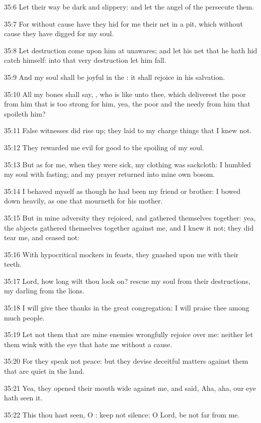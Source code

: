 35:6 Let their way be dark and slippery: and let the angel of the \LORD
persecute them.

35:7 For without cause have they hid for me their net in a pit, which
without cause they have digged for my soul.

35:8 Let destruction come upon him at unawares; and let his net that
he hath hid catch himself: into that very destruction let him fall.

35:9 And my soul shall be joyful in the \LORD: it shall rejoice in his
salvation.

35:10 All my bones shall say, \LORD, who is like unto thee, which
deliverest the poor from him that is too strong for him, yea, the poor
and the needy from him that spoileth him?

35:11 False witnesses did rise up; they laid to my charge things that
I knew not.

35:12 They rewarded me evil for good to the spoiling of my soul.

35:13 But as for me, when they were sick, my clothing was sackcloth: I
humbled my soul with fasting; and my prayer returned into mine own
bosom.

35:14 I behaved myself as though he had been my friend or brother: I
bowed down heavily, as one that mourneth for his mother.

35:15 But in mine adversity they rejoiced, and gathered themselves
together: yea, the abjects gathered themselves together against me,
and I knew it not; they did tear me, and ceased not:

35:16 With hypocritical mockers in feasts, they gnashed upon me with
their teeth.

35:17 Lord, how long wilt thou look on? rescue my soul from their
destructions, my darling from the lions.

35:18 I will give thee thanks in the great congregation: I will praise
thee among much people.

35:19 Let not them that are mine enemies wrongfully rejoice over me:
neither let them wink with the eye that hate me without a cause.

35:20 For they speak not peace: but they devise deceitful matters
against them that are quiet in the land.

35:21 Yea, they opened their mouth wide against me, and said, Aha,
aha, our eye hath seen it.

35:22 This thou hast seen, O \LORD: keep not silence: O Lord, be not
far from me.


